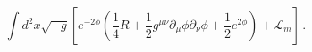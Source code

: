\begin{equation}
\int d^2x \sqrt{-g} \left[ e^{-2\phi} \left( \frac{1}{4} R + \frac{1}{2}
g^{\mu\nu}\partial_\mu\phi\partial_\nu\phi + \frac{1}{2}e^{2\phi}
\right) + \mathcal{L}_m \right]\, .
\end{equation}

